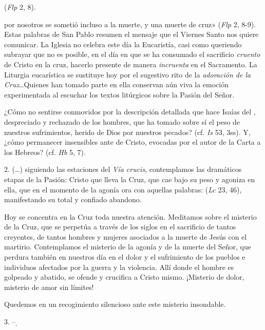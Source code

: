\begin{body}
 (\textit{Flp} 2, 8).

 por nosotros se sometió incluso a la muerte, y una muerte de cruz» (\textit{Flp} 2, 8-9). Estas palabras de San Pablo resumen el mensaje que el Viernes Santo nos quiere comunicar. La Iglesia no celebra este día la Eucaristía, casi como queriendo subrayar que no es posible, en el día en que se ha consumado el sacrificio \textit{cruento} de Cristo en la cruz, hacerlo presente de manera \textit{incruenta} en el Sacramento. La Liturgia eucarística se sustituye hoy por el sugestivo rito de la \textit{adoración de la Cruz}\ldots Quienes han tomado parte en ella conservan aún viva la emoción experimentada al escuchar los textos litúrgicos sobre la Pasión del Señor.

¿Cómo no sentirse conmovidos por la descripción detallada que hace Isaías del , despreciado y rechazado de los hombres, que ha tomado sobre sí el peso de nuestros sufrimientos, herido de Dios por nuestros pecados? (cf. \textit{Is} 53, 3ss). Y, ¿cómo permanecer insensibles ante  de Cristo, evocadas por el autor de la Carta a los Hebreos? (cf. \textit{Hb} 5, 7).

2. (\ldots) siguiendo las estaciones del \textit{Vía crucis}, contemplamos las dramáticos etapas de la Pasión: Cristo que lleva la Cruz, que cae bajo su peso y agoniza en ella, que en el momento de la agonía ora con aquellas palabras:  (\textit{Lc} 23, 46), manifestando su total y confiado abandono.

Hoy se concentra en la Cruz toda nuestra atención. Meditamos sobre el misterio de la Cruz, que se perpetúa a través de los siglos en el sacrificio de tantos creyentes, de tantos hombres y mujeres asociados a la muerte de Jesús con el martirio. Contemplamos el misterio de la agonía y de la muerte del Señor, que perdura también en nuestros día en el dolor y el sufrimiento de los pueblos e individuos afectados por la guerra y la violencia. Allí donde el hombre es golpeado y abatido, se ofende y crucifica a Cristo mismo. ¡Misterio de dolor, misterio de amor sin límites! 

Quedemos en un recogimiento silencioso ante este misterio insondable.

3.  -- ̣


\end{body}
